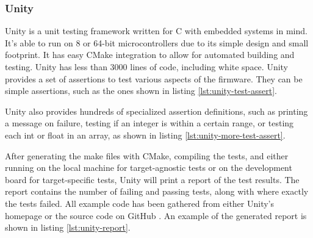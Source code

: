 \subsubsection{Unity}
Unity is a unit testing framework written for C with embedded systems in mind.
It's able to run on 8 or 64-bit microcontrollers due to its simple design and
small footprint. It has easy CMake integration to allow for automated building
and testing. Unity has less than 3000 lines of code, including white space.
Unity provides a set of assertions to test various aspects of the firmware. They
can be simple assertions, such as the ones shown in listing \ref{lst:unity-test-assert}.

Unity also provides hundreds of specialized assertion definitions, such as
printing a message on failure, testing if an integer is within a certain range,
or testing each int or float in an array, as shown in listing \ref{lst:unity-more-test-assert}.

After generating the make files with CMake, compiling the tests, and either
running on the local machine for target-agnostic tests or on the development
board for target-specific tests, Unity will print a report of the test results.
The report contains the number of failing and passing tests, along with where
exactly the tests failed. All example code has been gathered from either Unity's
homepage \cite{unity-homepage} or the source code on GitHub \cite{unity-github}.
An example of the generated report is shown in listing \ref{lst:unity-report}.

